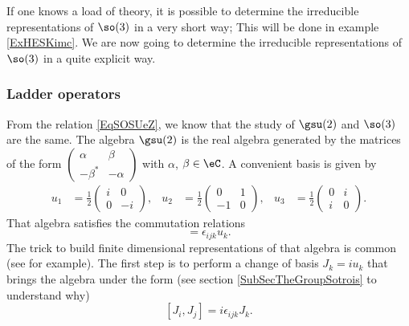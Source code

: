 If one knows a load of theory, it is possible to determine the irreducible representations of \( \so(3)\) in a very short way; This will be done in example \ref{ExHESKimc}. We are now going to determine the irreducible representations of \( \so(3)\) in a quite explicit way. 

\subsubsection{Ladder operators}

From the relation \eqref{EqSOSUeZ}, we know that the study of $\gsu(2)$ and $\so(3)$ are the same. The algebra $\gsu(2)$ is the real algebra generated by the matrices of the form
$
\begin{pmatrix}
\alpha  &\beta\\
-\beta^*&-\alpha
\end{pmatrix}
$ with $\alpha$, $\beta\in\eC$. A convenient basis is given by
\begin{align}       \label{EqGenssudeux}
u_1&=\frac{ 1 }{2}
\begin{pmatrix}
  i &   0   \\
  0 &   -i  
\end{pmatrix},
&u_2&=
\frac{ 1 }{2}
\begin{pmatrix}
  0 &   1   \\ 
  -1    &   0   
\end{pmatrix},
&u_3&=\frac{ 1 }{2}
\begin{pmatrix}
  0 &   i   \\ 
  i &   0
\end{pmatrix}.
\end{align}
That algebra satisfies the commutation relations
\begin{equation}
    [u_i,u_j]=\epsilon_{ijk}u_k.
\end{equation}
The trick to build finite dimensional representations of that algebra is common (see \cite{MQSenechal} for example). The first step is to perform a change of basis $J_k=iu_k$ that brings the algebra under the form (see section \ref{SubSecTheGroupSotrois} to understand why)
\begin{equation}        \label{EqAlgsuiepsijk}
    [J_i,J_j]=i\epsilon_{ijk}J_k.
\end{equation}
